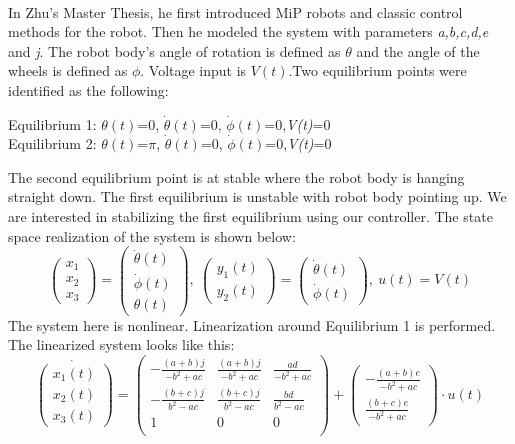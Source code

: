 \documentclass{article}
\begin{document}
\paragraph{}
In Zhu's Master Thesis, he first introduced MiP robots and classic control methods for the robot. Then he modeled the system with parameters \textit{a,b,c,d,e} and \textit{j}. The robot body's angle of rotation is defined as $\theta$ and the angle of the wheels is defined as $\phi$. Voltage input is $V(t)$.Two equilibrium points were identified as the following:\\
\begin{center}
{Equilibrium 1: $\theta(t)$=0, $\dot{\theta}(t)$=0, $\dot{\phi}(t)$=0,\textit{V(t)}=0\\
Equilibrium 2: $\theta(t)$=$\pi$, $\dot{\theta}(t)$=0, $\dot{\phi}(t)$=0,\textit{V(t)}=0}\\
\end{center}
\noindent The second equilibrium point is at stable where the robot body is hanging straight down. The first equilibrium is unstable with robot body pointing up. We are interested in stabilizing the first equilibrium using our controller. The state space realization of the system is shown below:
$$
\begin{pmatrix}
x_1\\
x_2\\
x_3 
\end{pmatrix}
=
\begin{pmatrix}
\dot{\theta}(t)\\
\dot{\phi}(t)\\
\theta(t)
\end{pmatrix}
,\
\begin{pmatrix}
y_1(t)\\
y_2(t)
\end{pmatrix}
=
\begin{pmatrix}
\dot{\theta}(t)\\
\dot{\phi}(t)
\end{pmatrix}
,\
u(t)=V(t)
$$
The system here is nonlinear. Linearization around Equilibrium 1 is performed. The linearized system looks like this:
$$
\dot{
\begin{pmatrix}
x_1(t)\\[6pt]
x_2(t)\\[6pt]
x_3(t)
\end{pmatrix}
}
=
\begin{pmatrix}
-\frac{(a+b)j}{-b^2+ac} & \frac{(a+b)j}{-b^2+ac} & \frac{ad}{-b^2+ac}\\[6pt]
-\frac{(b+c)j}{b^2-ac} & \frac{(b+c)j}{b^2-ac} & \frac{bd}{b^2-ac}\\[6pt]
1 & 0 & 0\\
\end{pmatrix}
+
\begin{pmatrix}
-\frac{(a+b)e}{-b^2+ac}\\[6pt]
\frac{(b+c)e}{-b^2+ac}
\end{pmatrix}
\cdot
u(t)
$$
\end{document}
